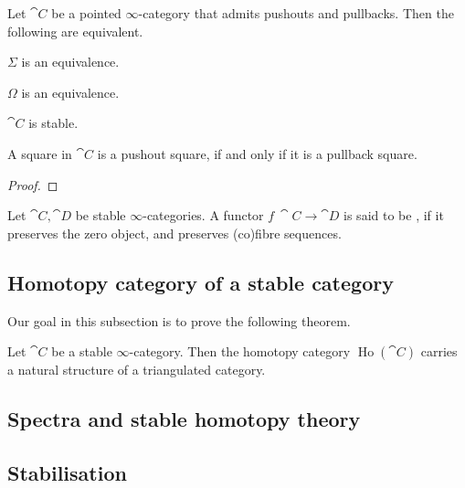 \begin{proposition}
    Let $\cat C$ be a pointed $\infty$-category 
    that admits pushouts and pullbacks. Then the following are equivalent.
    \begin{itms}
        \item $\Sigma$ is an equivalence.
        \item $\Omega$ is an equivalence.
        \item $\cat C$ is stable.
        \item A square in $\cat C$ is a pushout square,
        if and only if it is a pullback square.
    \end{itms}
\end{proposition}

\begin{proof}
    \nyw
\end{proof}

\begin{definition}
    Let $\cat C,\cat D$ be stable $\infty$-categories.
    A functor $f\:\cat C\to\cat D$ is said to be ,
    if it preserves the zero object,
    and preserves (co)fibre sequences.
\end{definition}

\subsection{Homotopy category of a stable category}

Our goal in this subsection is to prove the following theorem.

\begin{theorem}
    Let $\cat C$ be a stable $\infty$-category.
    Then the homotopy category $\operatorname{Ho}(\cat C)$
    carries a natural structure of a triangulated category.
\end{theorem}

\tbc

\subsection{Spectra and stable homotopy theory}

\nyw

\subsection{Stabilisation}

\nyw
